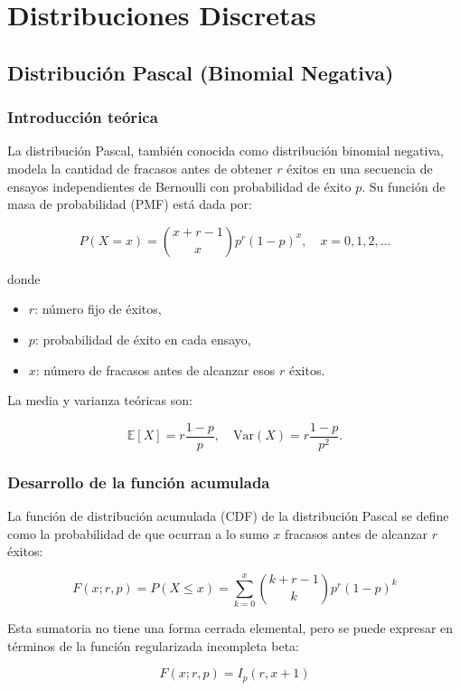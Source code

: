 \documentclass{article}
\begin{document}
\section{Distribuciones Discretas}

\subsection{Distribución Pascal (Binomial Negativa)}

\subsubsection{Introducción teórica}

La distribución Pascal, también conocida como distribución binomial negativa, modela la cantidad de fracasos antes de obtener $r$ éxitos en una secuencia de ensayos independientes de Bernoulli con probabilidad de éxito $p$. Su función de masa de probabilidad (PMF) está dada por:

\[
P(X = x) = \binom{x+r-1}{x} p^r (1-p)^x, \quad x = 0, 1, 2, \ldots
\]

donde
\begin{itemize}
    \item $r$: número fijo de éxitos,
    \item $p$: probabilidad de éxito en cada ensayo,
    \item $x$: número de fracasos antes de alcanzar esos $r$ éxitos.
\end{itemize}

La media y varianza teóricas son:

\[
\mathbb{E}[X] = r \frac{1-p}{p}, \quad \mathrm{Var}(X) = r \frac{1-p}{p^2}.
\]

\subsubsection{Desarrollo de la función acumulada}

La función de distribución acumulada (CDF) de la distribución Pascal se define como la probabilidad de que ocurran a lo sumo $x$ fracasos antes de alcanzar $r$ éxitos:

\[
F(x; r, p) = P(X \leq x) = \sum_{k=0}^{x} \binom{k + r - 1}{k} p^r (1 - p)^k
\]

Esta sumatoria no tiene una forma cerrada elemental, pero se puede expresar en términos de la función regularizada incompleta beta:

\[
F(x; r, p) = I_p(r, x + 1)
\]
\end{document}
